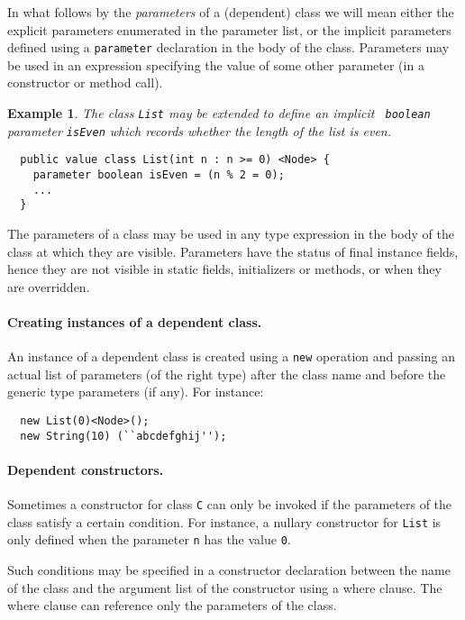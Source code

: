 \documentclass[fullpage]{article}
\newtheorem{example}{Example}[section]
\begin{document}
In what follows by the {\em parameters} of a (dependent) class we will
mean either the explicit parameters enumerated in the parameter list,
or the implicit parameters defined using a {\tt parameter} declaration
in the body of the class. Parameters may be used  in an
expression specifying the value of some other parameter (in a
constructor or method call).

\begin{example}
The class {\tt List} may be extended to define an implicit {\tt
boolean} parameter {\tt isEven} which records whether the length of
the list is even.
{\footnotesize
\begin{verbatim}
  public value class List(int n : n >= 0) <Node> {
    parameter boolean isEven = (n % 2 = 0);
    ...
  }  
\end{verbatim}}
\end{example}

The parameters of a class may be used in any type expression in the
body of the class at which they are visible. Parameters have the
status of final instance fields, hence they are not visible in static
fields, initializers or methods, or when they are overridden.

{}\paragraph{Creating instances of a dependent class.}
An instance of a dependent class is created using a {\tt new} operation
and passing an actual list of parameters (of the right type) after the 
class name and before the generic type parameters (if any).  For instance:
{\footnotesize
\begin{verbatim}
  new List(0)<Node>();
  new String(10) (``abcdefghij'');
\end{verbatim}}

{}\paragraph{Dependent constructors.} Sometimes a constructor for
class {\tt C} can only be invoked if the parameters of the class
satisfy a certain condition. For instance, a nullary constructor for
{\tt List} is only defined when the parameter {\tt n} has the value
{\tt 0}.

Such conditions may be specified in a constructor declaration between
the name of the class and the argument list of the constructor using a
where clause. The where clause can reference only the parameters of
the class.
\end{document}
